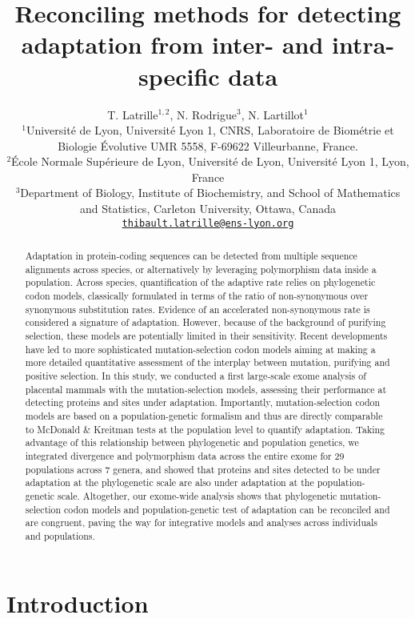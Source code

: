 \documentclass{article}
\title{Reconciling methods for detecting adaptation from inter- and intra-specific data}
\author{
    \large
    T. {Latrille}$^{1,2}$, N. {Rodrigue}$^{3}$, N. {Lartillot}$^{1}$\\
    \normalsize
    $^{1}$Université de Lyon, Université Lyon 1, CNRS, Laboratoire de Biométrie et Biologie Évolutive UMR 5558, F-69622 Villeurbanne, France.\\
    $^{2}$École Normale Supérieure de Lyon, Université de Lyon, Université Lyon 1, Lyon, France\\
    $^{3}$Department of Biology, Institute of Biochemistry, and School of Mathematics and Statistics, Carleton University, Ottawa, Canada \\
    \texttt{\href{mailto:thibault.latrille@ens-lyon.org}{thibault.latrille@ens-lyon.org}} \\
}
\begin{document}
    \maketitle

    \begin{abstract}
        Adaptation in protein-coding sequences can be detected from multiple sequence alignments across species, or alternatively by leveraging polymorphism data inside a population.
        Across species, quantification of the adaptive rate relies on phylogenetic codon models, classically formulated in terms of the ratio of non-synonymous over synonymous substitution rates.
        Evidence of an accelerated non-synonymous rate is considered a signature of adaptation.
        However, because of the background of purifying selection, these models are potentially limited in their sensitivity.
        Recent developments have led to more sophisticated mutation-selection codon models aiming at making a more detailed quantitative assessment of the interplay between mutation, purifying and positive selection.
        In this study, we conducted a first large-scale exome analysis of placental mammals with the mutation-selection models, assessing their performance at detecting proteins and sites under adaptation.
        Importantly, mutation-selection codon models are based on a population-genetic formalism and thus are directly comparable to McDonald \& Kreitman tests at the population level to quantify adaptation.
        Taking advantage of this relationship between phylogenetic and population genetics, we integrated divergence and polymorphism data across the entire exome for 29 populations across 7 genera, and showed that proteins and sites detected to be under adaptation at the phylogenetic scale are also under adaptation at the population-genetic scale.
        Altogether, our exome-wide analysis shows that phylogenetic mutation-selection codon models and population-genetic test of adaptation can be reconciled and are congruent, paving the way for integrative models and analyses across individuals and populations.
    \end{abstract}


    \section*{Introduction}
\end{document}
